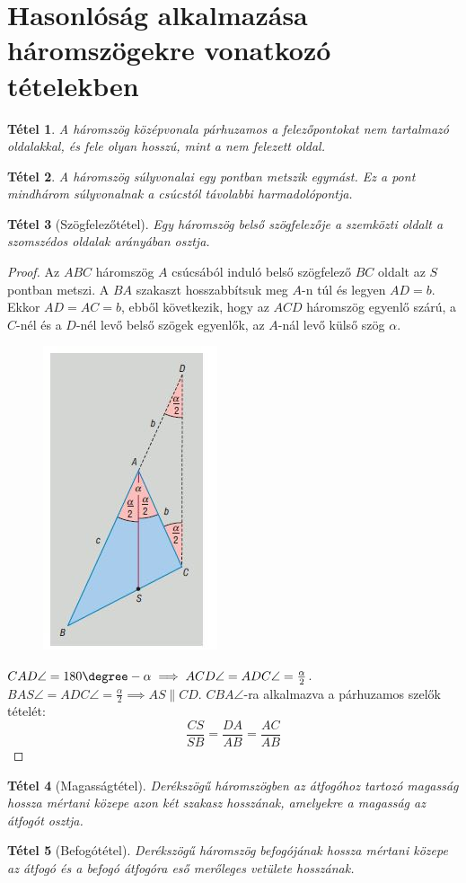 \documentclass[twoside,12pt]{report}
\newtheorem{theorem}{Tétel}[section]
\theoremstyle{definition}
\begin{document}
\section{Hasonlóság alkalmazása háromszögekre vonatkozó tételekben}
	\begin{theorem}
		A háromszög középvonala párhuzamos a felezőpontokat nem tartalmazó oldalakkal, és fele olyan hosszú, mint a nem felezett oldal.
	\end{theorem}
	\begin{theorem}
		A háromszög súlyvonalai egy pontban metszik egymást. Ez a pont mindhárom súlyvonalnak a csúcstól távolabbi harmadolópontja.
	\end{theorem}
	\begin{theorem}[Szögfelezőtétel]
		Egy háromszög belső szögfelezője a szemközti oldalt a szomszédos oldalak
		arányában osztja.
	\end{theorem}
	\begin{proof}
		Az $ABC$ háromszög $A$ csúcsából induló belső szögfelező $BC$ oldalt az $S$ pontban
		metszi. A $BA$ szakaszt hosszabbítsuk meg $A$-n túl és legyen $AD = b$. Ekkor $AD = AC = b$, ebből következik, hogy az $ACD$ háromszög egyenlő szárú, a $C$-nél és a $D$-nél levő belső szögek egyenlők, az $A$-nál levő külső szög $\alpha$.
		\begin{figure}[H]
			\centering
			\includegraphics[width=0.3\linewidth]{SZFT}
		\end{figure}
		
		$CAD\angle=180\degree-\alpha\implies ACD\angle=ADC\angle=\frac{\alpha}{2}$. $BAS\angle=ADC\angle=\frac{\alpha}{2}\implies AS\|CD$. $CBA\angle$-ra alkalmazva a párhuzamos szelők tételét:
		\begin{equation*}
			\frac{CS}{SB}=\frac{DA}{AB}=\frac{AC}{AB}
		\end{equation*}
	\end{proof}
	\begin{theorem}[Magasságtétel]
		Derékszögű háromszögben az átfogóhoz tartozó magasság hossza mértani közepe azon két szakasz hosszának, amelyekre a magasság az átfogót osztja.
	\end{theorem}
	\begin{theorem}[Befogótétel]
		Derékszögű háromszög befogójának hossza mértani közepe az átfogó és a befogó átfogóra eső merőleges vetülete hosszának.
	\end{theorem}
\end{document}
